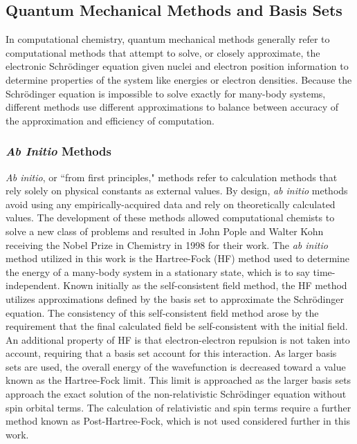 \subsection{Quantum Mechanical Methods and Basis Sets}

In computational chemistry, quantum mechanical methods generally refer to computational methods that attempt to solve, or closely approximate, the electronic Schr\"{o}dinger equation given nuclei and electron position information to determine properties of the system like energies or electron densities.
Because the Schr\"{o}dinger equation is impossible to solve exactly for many-body systems, different methods use different approximations to balance between accuracy of the approximation and efficiency of computation.

\subsubsection{\textit{Ab Initio} Methods}

\textit{Ab initio}, or ``from first principles," methods refer to calculation methods that rely solely on physical constants as external values.
By design, \textit{ab initio} methods avoid using any empirically-acquired data and rely on theoretically calculated values.
The development of these methods allowed computational chemists to solve a new class of problems and resulted in John Pople and Walter Kohn receiving the Nobel Prize in Chemistry in 1998 for their work.
The \textit{ab initio} method utilized in this work is the Hartree-Fock (HF) method used to determine the energy of a many-body system in a stationary state, which is to say time-independent.\cite{hartree_1928}
Known initially as the self-consistent field method, the HF method utilizes approximations defined by the basis set to approximate the Schr\"{o}dinger equation. 
The consistency of this self-consistent field method arose by the requirement that the final calculated field be self-consistent with the initial field.
An additional property of HF is that electron-electron repulsion is not taken into account, requiring that a basis set account for this interaction.
As larger basis sets are used, the overall energy of the wavefunction is decreased toward a value known as the Hartree-Fock limit.
This limit is approached as the larger basis sets approach the exact solution of the non-relativistic Schr\"{o}dinger equation without spin orbital terms.
The calculation of relativistic and spin terms require a further method known as Post-Hartree-Fock, which is not used considered further in this work.

